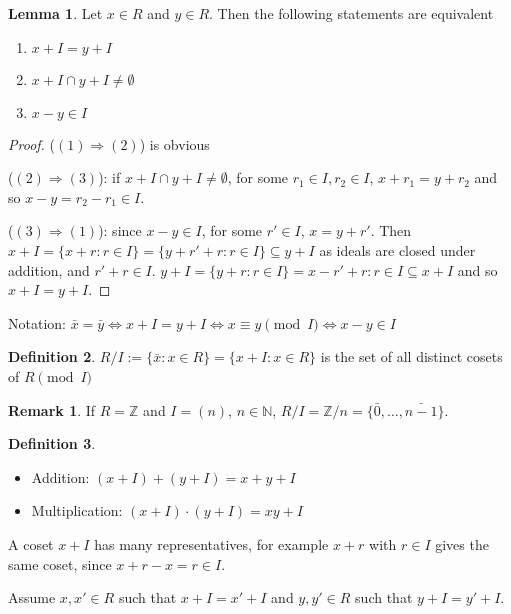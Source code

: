 \documentclass[12pt,a4paper]{article}
\theoremstyle{definition}
\newtheorem{definition}{Definition}[subsection]
\newtheorem{lemma}[definition]{Lemma}
\newtheorem*{remark}{Remark}
\begin{document}
\begin{lemma}
	Let $x \in R$ and $y \in R$. Then the following statements are equivalent
	\begin{enumerate}
		\item $x + I = y + I$
		\item $x + I \cap y + I \ne \emptyset$
		\item $x - y \in I$
	\end{enumerate}
\end{lemma}

\begin{proof}
	($(1) \Rightarrow (2)$) is obvious

	($(2) \Rightarrow (3)$): if $x + I \cap y + I \ne \emptyset$, for some $r_1 \in I, r_2 \in I$, $x + r_1 = y + r_2$ and so $x - y = r_2 - r_1 \in I$.

	($(3) \Rightarrow (1)$): since $x - y \in I$, for some $r' \in I$, $x = y + r'$. Then $x + I = \{x + r: r \in I\} = \{y + r' + r: r \in I\} \subseteq y + I$ as ideals are closed under addition, and $r' + r \in I$. $y + I = \{y + r: r \in I\} = {x - r' + r: r \in I} \subseteq x + I$ and so $x + I = y + I$.
\end{proof}

Notation: $\bar{x} = \bar{y} \Leftrightarrow x + I = y + I \Leftrightarrow x \equiv y \pmod I \Leftrightarrow x - y \in I$

\begin{definition}
	$R / I := \{\bar{x}: x \in R \} = \{x + I: x \in R\}$ is the set of all distinct cosets of $R \pmod I$ 
\end{definition}

\begin{remark}
	If $R = \mathbb{Z}$ and $I = (n)$, $n \in \mathbb{N}$, $R / I = \mathbb{Z} / n = \{\bar{0}, \dots, \bar{n - 1}\}$.
\end{remark}

\begin{definition}
	\hfill\break
	\begin{itemize}
		\item Addition: $(x + I) + (y + I) = x + y + I$
		\item Multiplication: $(x + I) \cdot (y + I) = xy + I$
	\end{itemize}
\end{definition}

A coset $x + I$ has many representatives, for example $x + r$ with $r \in I$ gives the same coset, since $x + r - x = r \in I$.

Assume $x, x' \in R$ such that $x + I = x' + I$ and $y, y' \in R$ such that $y + I = y' + I$.
\end{document}
